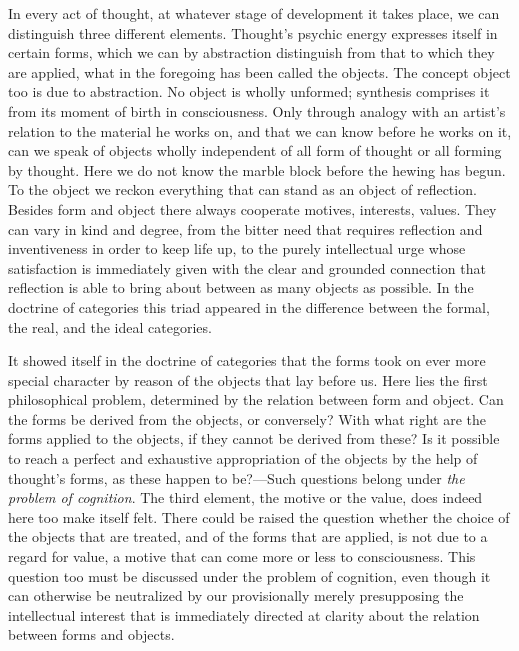 \documentclass[12pt,a4paper]{book}
\newcommand{\opage}[1]{\marginnote{\footnotesize\textit{[#1]}}}
\begin{document}
In every act of thought, at whatever stage of development it takes place, we
can distinguish three different elements. Thought's psychic energy expresses
itself in certain forms, which we can by abstraction distinguish from that to
which they are applied, what in the foregoing has been called the objects. The
concept object too is due to abstraction. No object is wholly unformed;
synthesis comprises it from its moment of birth in consciousness. Only
through analogy with an artist's relation to the material he works on, and
that we can know before he works on it, can we speak of objects wholly
independent of all form of thought or all forming by thought. Here we do not
know the marble block before the hewing has begun. To the object we reckon
everything that can stand as an object of reflection. Besides form and object
there always cooperate motives, interests, values. They can vary in kind and
degree, from the bitter need that requires reflection and inventiveness in
order to keep life up, to the purely intellectual urge whose satisfaction is
immediately given with the clear and grounded connection that reflection is
able to bring about between as many objects as possible. In the doctrine of
categories this \opage{249}triad appeared in the difference between the formal, the real,
and the ideal categories.

It showed itself in the doctrine of categories that the forms took on ever
more special character by reason of the objects that lay before us. Here lies
the first philosophical problem, determined by the relation between form and
object. Can the forms be derived from the objects, or conversely? With what
right are the forms applied to the objects, if they cannot be derived from
these? Is it possible to reach a perfect and exhaustive appropriation of the
objects by the help of thought's forms, as these happen to be?---Such
questions belong under \emph{the problem of cognition}. The third element, the
motive or the value, does indeed here too make itself felt. There could be
raised the question whether the choice of the objects that are treated, and of
the forms that are applied, is not due to a regard for value, a motive that
can come more or less to consciousness. This question too must be discussed
under the problem of cognition, even though it can otherwise be neutralized by
our provisionally merely presupposing the intellectual interest that is
immediately directed at clarity about the relation between forms and objects.
\end{document}
